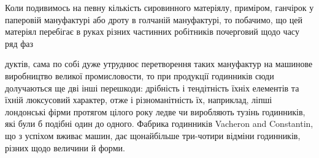 Коли подивимось на певну кількість сировинного матеріялу,
приміром, ганчірок у паперовій мануфактурі або дроту в голчаній
мануфактурі, то побачимо, що цей матеріял перебігає в руках
різних частинних робітників почерговий щодо часу ряд фаз

дуктів, сама по собі дуже утруднює перетворення таких мануфактур на
машинове виробництво великої промисловости, то при продукції годинників
сюди долучаються ще дві інші перешкоди: дрібність і тендітність
їхніх елементів та їхній люксусовий характер, отже і різноманітність їх,
наприклад, ліпші лондонські фірми протягом цілого року ледве чи виробляють
тузінь годинників, які були б подібні один до одного. Фабрика
годинників Vacheron and Constantin, що з успіхом вживає машин,
дає щонайбільше три-чотири відміни годинників, різних щодо величини
й форми.
\parbreak{}  %
